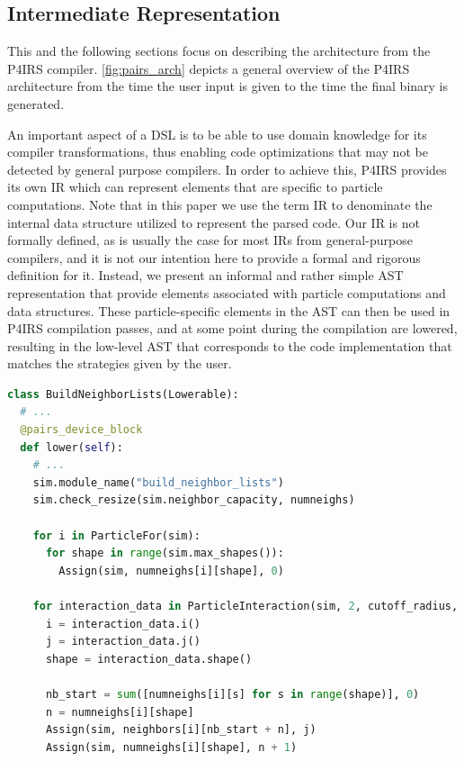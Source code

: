 \documentclass[Afour,sageh,times]{sagej}
\newcommand{\RMchange}[1]{{\color{blue} #1}}
\begin{document}
\subsection{\RMchange{Intermediate Representation}}

\RMchange{This and the following sections focus on describing the architecture from the P4IRS compiler.
\autoref{fig:pairs_arch} depicts a general overview of the P4IRS architecture from the time the user input is given to the time the final binary is generated.

An important aspect of a \ac{DSL} is to be able to use domain knowledge for its compiler transformations, thus enabling code optimizations that may not be detected by general purpose compilers.
In order to achieve this, P4IRS provides its own \ac{IR} which can represent elements that are specific to particle computations.
Note that in this paper we use the term \ac{IR} to denominate the internal data structure utilized to represent the parsed code.
Our \ac{IR} is not formally defined, as is usually the case for most \ac{IR}s from general-purpose compilers, and it is not our intention here to provide a formal and rigorous definition for it.
Instead, we present an informal and rather simple \ac{AST} representation that provide elements associated with particle computations and data structures.
These particle-specific elements in the AST can then be used in P4IRS compilation passes, and at some point during the compilation are lowered, resulting in the low-level AST that corresponds to the code implementation that matches the strategies given by the user.}

\begin{lstlisting}[language=Python,
                   label={lst:build_neigh},
                   caption={Neighbor-lists intermediate representation construction in P4IRS. Elements that are explicitly built for the AST (both high and low level) are shown in purple, and implicit elements such as expressions are constructed via operator-overloading and bound to a statement at some point in the construction.}]
class BuildNeighborLists(Lowerable):
  # ...
  @pairs_device_block
  def lower(self):
    # ...
    sim.module_name("build_neighbor_lists")
    sim.check_resize(sim.neighbor_capacity, numneighs)

    for i in ParticleFor(sim):
      for shape in range(sim.max_shapes()):
        Assign(sim, numneighs[i][shape], 0)

    for interaction_data in ParticleInteraction(sim, 2, cutoff_radius, use_cell_lists=True):
      i = interaction_data.i()
      j = interaction_data.j()
      shape = interaction_data.shape()

      nb_start = sum([numneighs[i][s] for s in range(shape)], 0)
      n = numneighs[i][shape]
      Assign(sim, neighbors[i][nb_start + n], j)
      Assign(sim, numneighs[i][shape], n + 1)
\end{lstlisting}
\end{document}
